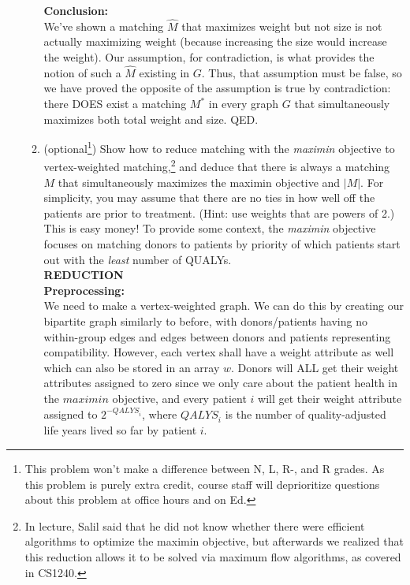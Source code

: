 \documentclass[11pt]{article}
\begin{document}
\begin{enumerate}
\begin{enumerate}
        \textbf{Conclusion: } \\
        We've shown a matching $\hat{M}$ that maximizes weight but not size is not actually maximizing weight (because increasing the size would increase the weight). Our assumption, for contradiction, is what provides the notion of such a $\hat{M}$ existing in $G$. Thus, that assumption must be false, so we have proved the opposite of the assumption is true by contradiction: there DOES exist a matching $M^*$ in every graph $G$ that simultaneously maximizes both total weight and size. QED. \\

        \item (optional\footnote{This problem won't make a difference between N, L, R-, and R grades. As this problem is purely extra credit, course staff will deprioritize questions about this problem at office hours and on Ed.}) Show how to reduce matching with the {\em maximin} objective to vertex-weighted matching,\footnote{In lecture, Salil said that he did not know whether there were efficient algorithms to optimize the maximin objective, but afterwards we realized that this reduction allows it to be solved via maximum flow algorithms, as covered in CS1240.}
        and deduce that there is always a matching $M$ that simultaneously maximizes the maximin objective and $|M|$.  For simplicity, you may assume that there are no ties in how well off the patients are prior to treatment.  (Hint: use weights that are powers of 2.) \\

        This is easy money! To provide some context, the \textit{maximin} objective focuses on matching donors to patients by priority of which patients start out with the \textit{least} number of QUALYs.\\

        \textbf{REDUCTION} \\

        \textbf{Preprocessing:} \\
        We need to make a vertex-weighted graph. We can do this by creating our bipartite graph similarly to before, with donors/patients having no within-group edges and edges between donors and patients representing compatibility. However, each vertex shall have a weight attribute as well which can also be stored in an array $w$. Donors will ALL get their weight attributes assigned to zero since we only care about the patient health in the $maximin$ objective, and every patient $i$ will get their weight attribute assigned to $2^{-{QALYS}_i}$, where ${QALYS}_i$ is the number of quality-adjusted life years lived so far by patient $i$. \\


\end{enumerate}
\end{enumerate}
\end{document}
